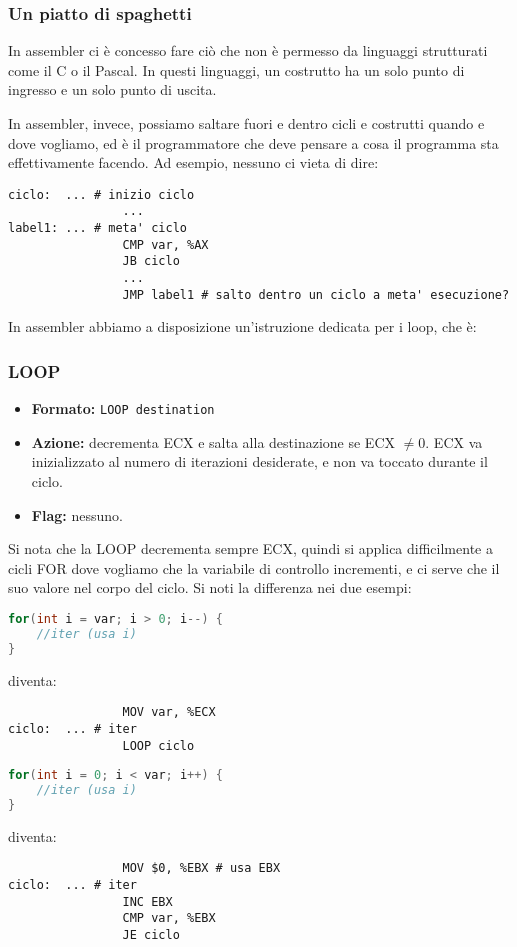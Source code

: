 \documentclass[a4paper,11pt]{article}
\begin{document}
\subsubsection{Un piatto di spaghetti}
In assembler ci è concesso fare ciò che non è permesso da linguaggi strutturati come il C o il Pascal.
In questi linguaggi, un costrutto ha un solo punto di ingresso e un solo punto di uscita.

In assembler, invece, possiamo saltare fuori e dentro cicli e costrutti quando e dove vogliamo, ed è il programmatore che deve pensare a cosa il programma sta effettivamente facendo. Ad esempio, nessuno ci vieta di dire:
\begin{lstlisting}	
ciclo: 	... # inizio ciclo
			 	...
label1:	... # meta' ciclo
				CMP var, %AX
				JB ciclo
				...
				JMP label1 # salto dentro un ciclo a meta' esecuzione?
\end{lstlisting}
\par\medskip
In assembler abbiamo a disposizione un'istruzione dedicata per i loop, che è:

\subsubsection{LOOP}
\begin{itemize}
	\item \textbf{Formato:} \lstinline|LOOP destination|
	\item \textbf{Azione:} decrementa ECX e salta alla destinazione se ECX $\neq0$. ECX va inizializzato al numero di iterazioni desiderate, e non va toccato durante il ciclo. 
	\item \textbf{Flag:} nessuno.
\end{itemize}

Si nota che la LOOP decrementa sempre ECX, quindi si applica difficilmente a cicli FOR dove vogliamo che la variabile di controllo incrementi, e ci serve che il suo valore nel corpo del ciclo. Si noti la differenza nei due esempi:

\begin{minipage}{0.45\textwidth}
\begin{lstlisting}[language=C++, style=codestyle]	
for(int i = var; i > 0; i--) {
	//iter (usa i)
}
\end{lstlisting}
diventa:
\begin{lstlisting}
				MOV var, %ECX
ciclo:	... # iter
				LOOP ciclo
\end{lstlisting}
\end{minipage}%
\hfill %
\begin{minipage}{0.45\textwidth}
\begin{lstlisting}[language=C++, style=codestyle]	
for(int i = 0; i < var; i++) {
	//iter (usa i)
}
\end{lstlisting}
diventa:
\begin{lstlisting}
				MOV $0, %EBX # usa EBX
ciclo:	... # iter
				INC EBX
				CMP var, %EBX
				JE ciclo
\end{lstlisting}
\end{minipage}
\end{document}
